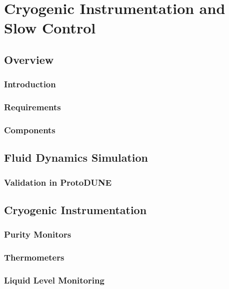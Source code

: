 \chapter{Cryogenic Instrumentation and Slow Control}
\label{ch:dp-cisc}

\section{Overview}

\subsection{Introduction}

\subsection{Requirements}

\subsection{Components}


\section{Fluid Dynamics Simulation}

\subsection{Validation in ProtoDUNE}


\section{Cryogenic Instrumentation}

\subsection{Purity Monitors}

\subsection{Thermometers}

\subsection{Liquid Level Monitoring}

